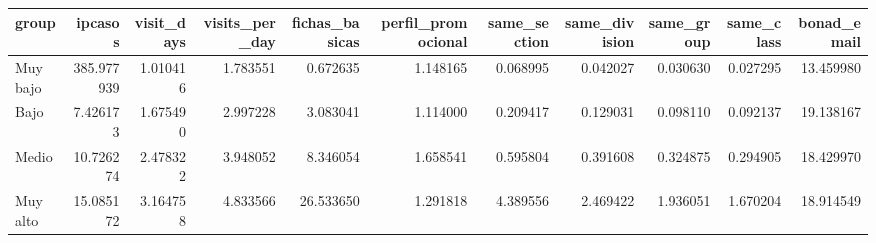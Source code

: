 \begin{tabular}{lrrrrrrrrrr}
\toprule
   group &    ipcasos &  visit\_days &  visits\_per\_day &  fichas\_basicas &  perfil\_promocional &  same\_section &  same\_division &  same\_group &  same\_class &  bonad\_email \\
\midrule
Muy bajo & 385.977939 &    1.010416 &        1.783551 &        0.672635 &            1.148165 &      0.068995 &       0.042027 &    0.030630 &    0.027295 &    13.459980 \\
    Bajo &   7.426173 &    1.675490 &        2.997228 &        3.083041 &            1.114000 &      0.209417 &       0.129031 &    0.098110 &    0.092137 &    19.138167 \\
   Medio &  10.726274 &    2.478322 &        3.948052 &        8.346054 &            1.658541 &      0.595804 &       0.391608 &    0.324875 &    0.294905 &    18.429970 \\
Muy alto &  15.085172 &    3.164758 &        4.833566 &       26.533650 &            1.291818 &      4.389556 &       2.469422 &    1.936051 &    1.670204 &    18.914549 \\
\bottomrule
\end{tabular}

